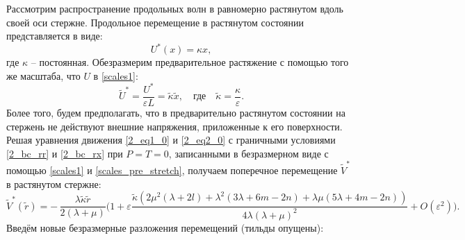 \documentclass[12pt, a4paper]{report}
\begin{document}
Рассмотрим распространение продольных волн в равномерно растянутом вдоль своей оси стержне. Продольное перемещение в растянутом состоянии представляется в виде:
\begin{equation}\label{pre_stretch_u}
U^*(x) = \kappa x,
\end{equation}
где $\kappa$ -- постоянная.
Обезразмерим предварительное растяжение с помощью того же масштаба, что $U$ в \eqref{scales1}:
\begin{equation} \label{scales_pre_stretch}
\tilde U^* = \frac{U^*}{\varepsilon L} = \tilde\kappa \tilde x, \quad \mbox{где} \quad  \tilde \kappa = \frac{\kappa}{\varepsilon}.
\end{equation}
Более того, будем предполагать, что в предварительно растянутом состоянии на стержень не действуют внешние напряжения, приложенные к его поверхности. Решая уравнения движения \eqref{2_eq1_0} и \eqref{2_eq2_0} с граничными условиями \eqref{2_bc_rr} и \eqref{2_bc_rx} при $P = T = 0$, записанными в безразмерном виде с помощью \eqref{scales1} и \eqref{scales_pre_stretch}, получаем поперечное перемещение $\tilde V^*$ в растянутом стержне:
\begin{equation}\label{pre_stretch_v}
\tilde V^*(\tilde r) = -\,\frac{\lambda \tilde\kappa \tilde r}{2(\lambda+\mu)} \bigg(1 + \varepsilon \frac{\tilde\kappa \left(2\mu^2 (\lambda + 2l) + \lambda^2 (3\lambda + 6m - 2n) + \lambda\mu(5\lambda + 4m - 2n)\right)}{4\lambda(\lambda + \mu)^2} 
+ O(\varepsilon^2)\bigg).
\end{equation}
Введём новые безразмерные разложения перемещений (тильды опущены):
\end{document}
